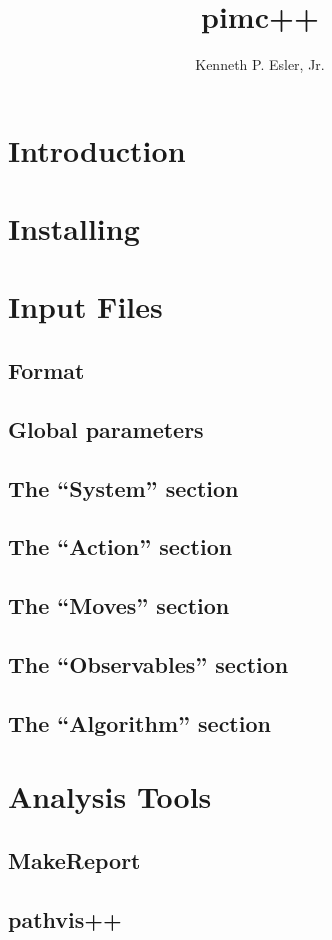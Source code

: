 \documentclass{book}
\author{Kenneth P. Esler, Jr.}
\title{pimc++}
\begin{document}
\maketitle
\chapter{Introduction}

\chapter{Installing}

\chapter{Input Files}
\section{Format}
\section{Global parameters}
\section{The ``System'' section}
\section{The ``Action'' section}
\section{The ``Moves'' section}
\section{The ``Observables'' section}
\section{The ``Algorithm'' section}

\chapter{Analysis Tools}
\section{MakeReport}

\section{pathvis++}
\end{document}
